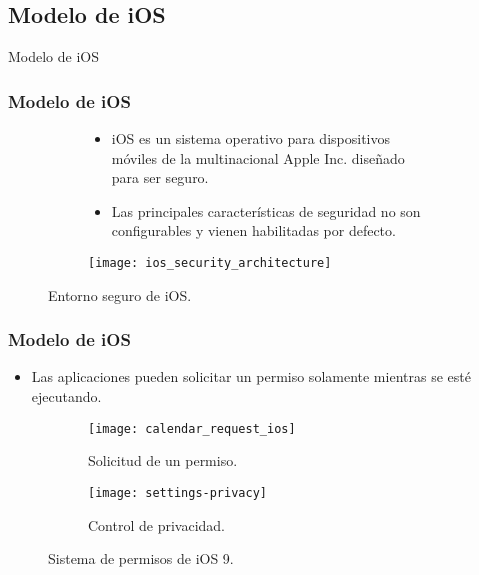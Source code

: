 \subsection{Modelo de iOS}
\begin{frame}
 \begin{center}
  \LARGE Modelo de iOS
 \end{center}
\end{frame}
\begin{frame}
 \frametitle{Modelo de iOS}
 \begin{figure}[tH]
  \begin{subfigure}{0.7\linewidth}
   \begin{itemize}
    \item iOS es un sistema operativo para dispositivos móviles de la multinacional Apple Inc. diseñado para ser
seguro.
    \item <3->{Las principales características de seguridad no son configurables y vienen habilitadas por defecto.}
   \end{itemize}
  \end{subfigure}
  \begin{subfigure}{0.25\linewidth}\pause
    \centering
    \texttt{[image: ios\_security\_architecture]}
  \end{subfigure}
  \caption{Entorno seguro de iOS.}
\end{figure}
\end{frame}
\begin{frame}
 \frametitle{Modelo de iOS}
 \begin{itemize}
  \item Las aplicaciones pueden solicitar un permiso solamente mientras se esté ejecutando. \pause
 \end{itemize}
 \begin{figure}[hbtp]
    \centering
    \begin{subfigure}{0.49\linewidth}
    \centering
    \texttt{[image: calendar\_request\_ios]}
    \caption{Solicitud de un permiso.}
    \end{subfigure}
    \begin{subfigure}{0.49\linewidth}
    \centering
     \texttt{[image: settings-privacy]}
    \caption{Control de privacidad.}
    \end{subfigure}
    \caption{Sistema de permisos de iOS 9.}
 \end{figure}
\end{frame}
